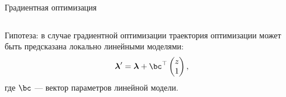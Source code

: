 \documentclass[12pt, aspectratio=169]{beamer}
\begin{document}
\begin{frame}{Градиентная оптимизация}
\begin{columns}[c]
\fontsize{12}{10}\selectfont
{\color{red}Гипотеза}: в случае градиентной оптимизации траектория оптимизации может быть предсказана локально линейными моделями:
\fontsize{12}{10}\selectfont
$$\boldsymbol{\lambda}^\prime = 
     \boldsymbol{\lambda} + \bc^{\top}\begin{pmatrix}z\\1\end{pmatrix},$$
\fontsize{12}{10}\selectfont
где $\bc$ --- вектор параметров линейной модели.
\end{columns}

\end{frame}
\end{document}
